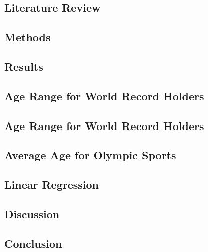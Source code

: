 \documentclass[letterpaper, 10 pt, conference]{ieeeconf}  %
\begin{document}
\subsection{Literature Review}
\subsection{Methods}
\subsection{Results}
\subsection{Age Range for World Record Holders}
\subsection{Age Range for World Record Holders}
\subsection{Average Age for Olympic Sports}
\subsection{Linear Regression}
\subsection{Discussion}
\subsection{Conclusion}
\end{document}
